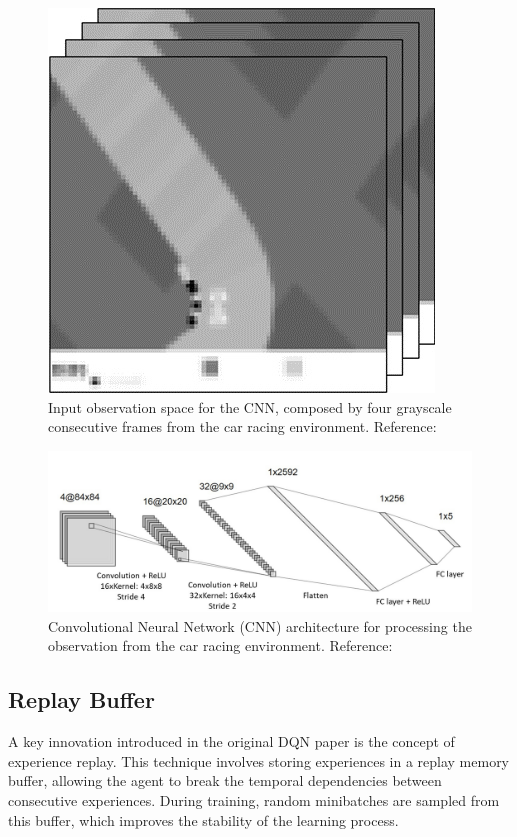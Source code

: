\documentclass[../CSC_52081_EP.tex]{subfiles}
\begin{document}
\begin{figure}[H]
    \centering
    \includegraphics[scale = 0.3]{figures/grayscale_4.png}
    \caption{Input observation space for the CNN, composed by four grayscale consecutive frames from the car racing environment. Reference: \cite{DQN_CNN}}
    \label{fig:grayscale}
\end{figure}

\begin{figure}[H]
    \centering
    \includegraphics[scale = 0.15]{figures/CNN.png}
    \caption{Convolutional Neural Network (CNN) architecture for processing the observation from the car racing environment. Reference: \cite{DQN_CNN}}
    \label{fig:CNN}
\end{figure}

\subsection{Replay Buffer}
A key innovation introduced in the original DQN paper is the concept of experience replay. This technique involves storing experiences in a replay memory buffer, allowing the agent to break the temporal dependencies between consecutive experiences. During training, random minibatches are sampled from this buffer, which improves the stability of the learning process.
\end{document}
